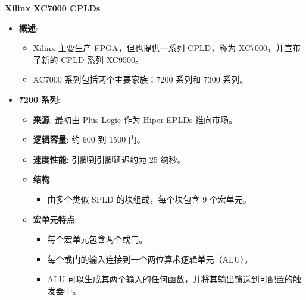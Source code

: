 \documentclass[
  ignorenonframetext,
  chinese,
]{beamer}
\providecommand{\tightlist}{%
  \setlength{\itemsep}{0pt}\setlength{\parskip}{0pt}}
\begin{document}
\begin{frame}
\begin{block}{\textbf{Xilinx XC7000 CPLDs}}
\label{xilinx-xc7000-cplds}
\begin{itemize}
\tightlist
\item
  \textbf{概述}:

  \begin{itemize}
  \tightlist
  \item
    Xilinx 主要生产 FPGA，但也提供一系列 CPLD，称为 XC7000，并宣布了新的
    CPLD 系列 XC9500。
  \item
    XC7000 系列包括两个主要家族：7200 系列和 7300 系列。
  \end{itemize}
\item
  \textbf{7200 系列}:

  \begin{itemize}
  \tightlist
  \item
    \textbf{来源}: 最初由 Plus Logic 作为 Hiper EPLDs 推向市场。
  \item
    \textbf{逻辑容量}: 约 600 到 1500 门。
  \item
    \textbf{速度性能}: 引脚到引脚延迟约为 25 纳秒。
  \item
    \textbf{结构}:

    \begin{itemize}
    \tightlist
    \item
      由多个类似 SPLD 的块组成，每个块包含 9 个宏单元。
    \end{itemize}
  \item
    \textbf{宏单元特点}:

    \begin{itemize}
    \tightlist
    \item
      每个宏单元包含两个或门。
    \item
      每个或门的输入连接到一个两位算术逻辑单元（ALU）。
  \item
      ALU
      可以生成其两个输入的任何函数，并将其输出馈送到可配置的触发器中。
    \end{itemize}
  \end{itemize}
\end{itemize}
\end{block}
\end{frame}
\end{document}
